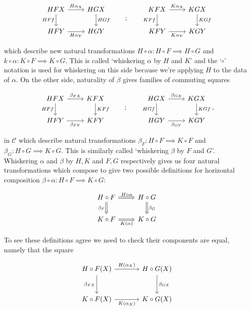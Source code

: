 \documentclass[11pt]{amsart}
\theoremstyle{plain}
\theoremstyle{definition}
\newcommand{\cC}{{\mathcal C}}
\newcommand{\noi}{{\noindent}}
\begin{document}
\[ \begin{tikzcd}
  HFX \rar["H\alpha_X"] \dar["HFf"'] & HGX \dar["HGf"] \\
HFY \rar["H\alpha_Y"'] & HGY
\end{tikzcd}\qquad ; \qquad 
\begin{tikzcd}
  KFX \rar["K\alpha_X"] \dar["KFf"'] & KGX \dar["KGf"] \\
KFY \rar["K\alpha_Y"'] & KGY
\end{tikzcd}\]


\noi which describe new natural transformations $H \circ \alpha : H \circ F \implies H \circ G$ and $k \circ \alpha : K \circ F \implies K \circ G$. This is called `whiskering $\alpha$ by $H$ and $K$' and the `$\circ$' notation is used for whiskering on this side because we're applying $H$ to the data of $\alpha$. On the other side, naturality of $\beta$ gives families of commuting squares 

\[ \begin{tikzcd}
  HFX \rar["\beta_{FX}"] \dar["HFf"'] & KFX \dar["KFf"] \\
HFY \rar["\beta_{FY}"'] & KFY
\end{tikzcd}\qquad ; \qquad 
\begin{tikzcd}
  HGX \rar["\beta_{GX}"] \dar["HGf"'] & KGX \dar["KGf"] \\
HGY \rar["\beta_{GY}"'] & KGY
\end{tikzcd},\]

\noi in $\cC$ which describe natural transformations $\beta_F: H\circ F \implies K \circ F$ and $\beta_G: H \circ G \implies K \circ G$. This is similarly called `whiskering $\beta$ by $F$ and $G$'. Whiskering $\alpha$ and $\beta$ by $H,K$ and $F,G$ respectively gives us four natural transformations which compose to give two possible definitions for horizontal composition $\beta \circ \alpha : H \circ F \implies K \circ G$:

\[ \begin{tikzcd}
  H \circ F 
  \rar[Rightarrow, "H\circ \alpha"]
   \dar[Rightarrow, "\beta_F"'] 
   & H \circ G \dar[Rightarrow, "\beta_G" ] \\
  K \circ F \rar[Rightarrow, "K(\alpha)"'] & K \circ G 
\end{tikzcd}\]

\noi To see these definitions agree we need to check their components are equal, namely that the square 

\[ \begin{tikzcd}[column sep = large, row sep = large]
  H\circ F (X) \dar["\beta_{FX}"']  \rar["H(\alpha_X)"] & H \circ G (X) \dar["\beta_{GX}"] \\
  K \circ F (X) \rar["K(\alpha_X)"'] & K \circ G (X)
\end{tikzcd}\]
\end{document}
